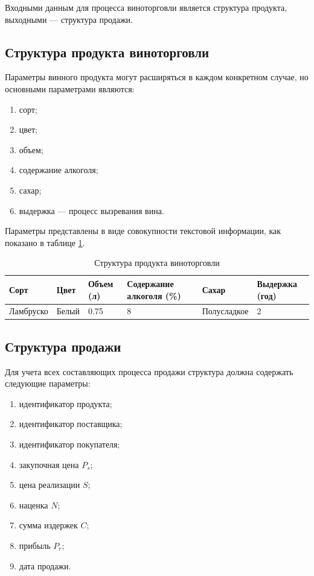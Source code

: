 Входными данным для процесса виноторговли является структура продукта, выходными --- структура продажи.

\subsection{Структура продукта виноторговли}

Параметры винного продукта могут расширяться в каждом конкретном случае, но основными параметрами являются:

\begin{enumerate}
	\item сорт;
	\item цвет;
	\item объем;
	\item содержание алкоголя;
	\item сахар;
	\item выдержка --- процесс вызревания вина.
\end{enumerate}

Параметры представлены в виде совокупности текстовой информации, как показано в таблице \ref{wine_structure}.

\begin{table}[h]
    \begin{center}
        \begin{threeparttable}
        \captionsetup{justification=raggedright,singlelinecheck=off}
    		\caption{Структура продукта виноторговли}
    		\label{wine_structure}
        \begin{tabular}{|l|l|l|p{30mm}|l|p{25mm}|}
            \hline
            Сорт & Цвет & Объем (л) & Содержание алкоголя (\%)  & Сахар & Выдержка (год) \\ \hline
            Ламбруско & Белый & 0.75 & 8 & Полусладкое & 2 \\ \hline
        \end{tabular}
    \end{threeparttable}
    \end{center}
\end{table}

\subsection{Структура продажи}

Для учета всех составляющих процесса продажи структура должна содержать следующие параметры:

\begin{enumerate}
	\item идентификатор продукта;
	\item идентификатор поставщика;
	\item идентификатор покупателя;
	\item закупочная цена $P_{s}$;
	\item цена реализации $S$;
	\item наценка $N$;
	\item сумма издержек $C$;
	\item прибыль $P_{r}$;
	\item дата продажи.
\end{enumerate}

